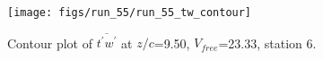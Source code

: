 \begin{figure}[H]
\centering
\texttt{[image: figs/run\_55/run\_55\_tw\_contour]}
\caption{Contour plot of $\overline{t^\prime w^\prime}$ at $z/c$=9.50, $V_{free}$=23.33, station 6.}
\label{fig:run_55_tw_contour}
\end{figure}


